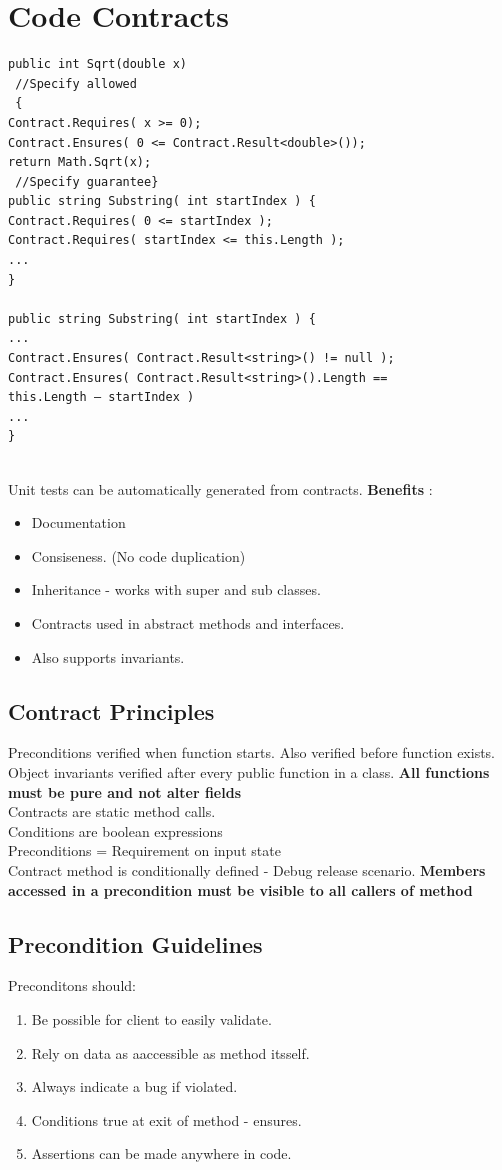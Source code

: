 \documentclass[a4paper,10pt]{scrartcl}
\begin{document}
\section{Code Contracts}
\begin{lstlisting}[caption=first example]
 public int Sqrt(double x)
 //Specify allowed
 {
Contract.Requires( x >= 0);
Contract.Ensures( 0 <= Contract.Result<double>());
return Math.Sqrt(x);
 //Specify guarantee}
public string Substring( int startIndex ) {
Contract.Requires( 0 <= startIndex );
Contract.Requires( startIndex <= this.Length );
...
}

public string Substring( int startIndex ) {
...
Contract.Ensures( Contract.Result<string>() != null );
Contract.Ensures( Contract.Result<string>().Length ==
this.Length – startIndex )
...
}


\end{lstlisting}

Unit tests can be automatically generated from contracts. 
\textbf{Benefits} : 
\begin{itemize}
 \item Documentation
 \item Consiseness. (No code duplication)
  \item Inheritance - works with super and sub classes.
  \item Contracts used in abstract methods and interfaces. 
  \item Also supports invariants. 
\end{itemize}

\subsection{Contract Principles}
Preconditions verified when function starts. Also verified before function exists. Object invariants verified after every public function in a class.
\textbf{All functions must be pure and not alter fields}\\
Contracts are static method calls. \\
Conditions are boolean expressions \\
Preconditions = Requirement on input state \\
Contract method is conditionally defined - Debug release scenario.
\textbf{Members accessed in a precondition must be visible to all callers of method}\\

\subsection{Precondition Guidelines}
Preconditons should:
\begin{enumerate}
 \item Be possible for client to easily validate.
  \item Rely on data as aaccessible as method itsself.
  \item Always indicate a bug if violated.
  \item Conditions true at exit of method - ensures.
  \item Assertions can be made anywhere in code. 
\end{enumerate}
\end{document}
